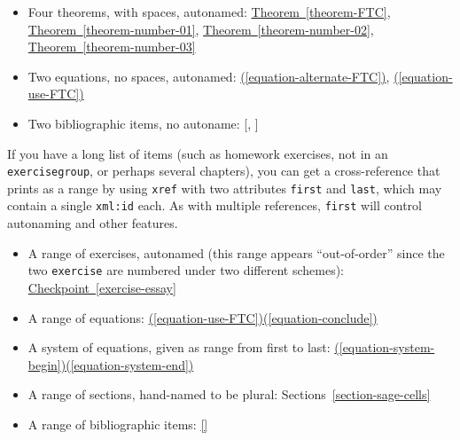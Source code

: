 \documentclass{sn-jnl}
\theoremstyle{thmstyleone}%
\theoremstyle{thmstyletwo}%
\theoremstyle{thmstylethree}%
\newcommand{\xreffont}{\relax}
\newcommand{\mono}[1]{\texttt{#1}}
\numberwithin{equation}{section}
\begin{document}
\begin{itemize}[label=\textbullet]
\item{}Four theorems, with spaces, autonamed: \hyperref[theorem-FTC]{Theorem~{\xreffont\ref{theorem-FTC}}}, \hyperref[theorem-number-01]{Theorem~{\xreffont\ref{theorem-number-01}}}, \hyperref[theorem-number-02]{Theorem~{\xreffont\ref{theorem-number-02}}}, \hyperref[theorem-number-03]{Theorem~{\xreffont\ref{theorem-number-03}}}%
\item{}Two equations, no spaces, autonamed: \hyperref[equation-alternate-FTC]{({\xreffont\ref{equation-alternate-FTC}})}, \hyperref[equation-use-FTC]{({\xreffont\ref{equation-use-FTC}})}%
\item{}Two bibliographic items, no autoname: [\hyperlink{biblio-judson-AATA}{{\xreffont 1}}, \hyperlink{biblio-lay-article}{{\xreffont 2}}]%
\end{itemize}
%
\par
If you have a long list of items (such as homework exercises, not in an \mono{exercisegroup}, or perhaps several chapters), you can get a cross-reference that prints as a range by using \mono{xref} with two attributes \mono{first} and \mono{last}, which may contain a single \mono{xml:id} each.  As with multiple references, \mono{first} will control autonaming and other features.%
\begin{itemize}[label=\textbullet]
\item{}A range of exercises, autonamed (this range appears ``out-of-order'' since the two \mono{exercise} are numbered under two different schemes): \hyperref[exercise-essay]{Checkpoint~{\xreffont\ref{exercise-essay}}\textendash{}{\xreffont 4.2.3.1}}%
\item{}A range of equations: \hyperref[equation-use-FTC]{({\xreffont\ref{equation-use-FTC}})\textendash{}({\xreffont\ref{equation-conclude}})}%
\item{}A system of equations, given as range from first to last: \hyperref[equation-system-begin]{({\xreffont\ref{equation-system-begin}})\textendash{}({\xreffont\ref{equation-system-end}})}%
\item{}A range of sections, hand-named to be plural: Sections~\hyperref[section-sage-cells]{{\xreffont\ref{section-sage-cells}}\textendash{}{\xreffont\ref{section-cross-referencing}}}%
\item{}A range of bibliographic items: \hyperlink{biblio-judson-AATA}{[{\xreffont 1}\textendash{}{\xreffont 2}]}%
\end{itemize}
%
\par
\end{document}
